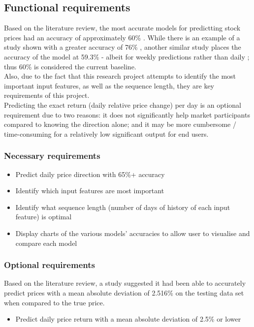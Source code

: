 \subsection{Functional requirements}
Based on the literature review, the most accurate models for predictting stock prices had an accuracy of
approximately 60\% \parencite{zhong2019predicting}. While there is an example of a study shown with a greater
accuracy of 76\% \parencite{shen2012stock}, another similar study places the accuracy of the model at 59.3\%
- albeit for weekly predictions rather than daily \parencite{hao_gao_2020}; thus 60\% is considered the
current baseline.\\
Also, due to the fact that this research project attempts to identify the most important input features, as
well as the sequence length, they are key requirements of this project.\\
Predicting the exact return (daily relative price change) per day is an optional requirement due to two
reasons: it does not significantly help market participants compared to knowing the direction alone; and
it may be more cumbersome / time-consuming for a relatively low significant output for end users.
\subsubsection{Necessary requirements}
\begin{itemize}
    \item Predict daily price direction with 65\%+ accuracy
    \item Identify which input features are most important
    \item Identify what sequence length (number of days of history of each input feature) is optimal
    \item Display charts of the various models' accuracies to allow user to visualise and compare each model
\end{itemize}
\subsubsection{Optional requirements}
Based on the literature review, a study suggested it had been able to accurately predict prices with a mean
absolute deviation of 2.516\% on the testing data set when compared to the true price.
\begin{itemize}
    \item Predict daily price return with a mean absolute deviation of 2.5\% or lower
\end{itemize}
